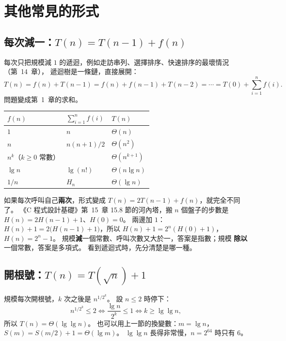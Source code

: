 \section{其他常見的形式}
\label{sec:rec-other}

\subsection{\texorpdfstring{每次減一：$T(n) = T(n-1) + f(n)$}{每次減一：T(n) = T(n-1) + f(n)}}

每次只把規模減 $1$ 的遞迴，例如走訪串列、選擇排序、快速排序的最壞情況（第~14~章），
遞迴樹是一條鏈，直接展開：
\[
T(n) = f(n) + T(n-1) = f(n) + f(n-1) + T(n-2) = \cdots = T(0) + \sum_{i=1}^{n} f(i).
\]
問題變成第~1~章的求和。

\begin{center}
\begin{tabular}{lll}
\toprule
$f(n)$ & $\sum_{i=1}^{n} f(i)$ & $T(n)$ \\
\midrule
$1$ & $n$ & $\Theta(n)$ \\
$n$ & $n(n+1)/2$ & $\Theta(n^2)$ \\
$n^k$（$k \ge 0$ 常數） & & $\Theta(n^{k+1})$ \\
$\lg n$ & $\lg(n!)$ & $\Theta(n \lg n)$ \\
$1/n$ & $H_n$ & $\Theta(\lg n)$ \\
\bottomrule
\end{tabular}
\end{center}

如果每次呼叫自己\textbf{兩次}，形式變成 $T(n) = 2T(n-1) + f(n)$，就完全不同了。
《C 程式設計基礎》第~15~章 15.8 節的河內塔，搬 $n$ 個盤子的步數是
$H(n) = 2H(n-1) + 1$、$H(0) = 0$。 兩邊加 $1$：
$H(n) + 1 = 2\bigl(H(n-1) + 1\bigr)$，所以 $H(n) + 1 = 2^n (H(0) + 1)$，
$H(n) = 2^n - 1$。 規模\textbf{減}一個常數、呼叫次數又大於一，答案是指數；規模
\textbf{除以}一個常數，答案是多項式。 看到遞迴式時，先分清楚是哪一種。

\subsection{\texorpdfstring{開根號：$T(n) = T(\sqrt{n}) + 1$}{開根號：T(n) = T(√n) + 1}}

規模每次開根號，$k$ 次之後是 $n^{1/2^k}$。 設 $n \le 2$ 時停下：
\[
n^{1/2^k} \le 2 \iff \frac{\lg n}{2^k} \le 1 \iff k \ge \lg \lg n,
\]
所以 $T(n) = \Theta(\lg \lg n)$。 也可以用上一節的換變數：$m = \lg n$，
$S(m) = S(m/2) + 1 = \Theta(\lg m)$。 $\lg \lg n$ 長得非常慢，$n = 2^{64}$ 時只有
$6$。

